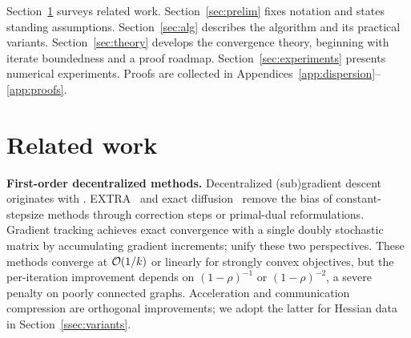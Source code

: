 \documentclass[review,onefignum,onetabnum]{siamart171218}
\begin{document}
Section~\ref{sec:related} surveys related work.
Section~\ref{sec:prelim} fixes notation and states standing assumptions.
Section~\ref{sec:alg} describes the algorithm and its practical variants.
Section~\ref{sec:theory} develops the convergence theory, beginning
with iterate boundedness and a proof roadmap.
Section~\ref{sec:experiments} presents numerical experiments.
Proofs are collected in
Appendices~\ref{app:dispersion}--\ref{app:proofs}.

	\section{Related work}\label{sec:related}
	
	\noindent\textbf{First-order decentralized methods.}
	Decentralized (sub)gradient descent originates with
	\citet{nedic2009subgradient}.
	EXTRA~\citep{shi2015extra} and exact
	diffusion~\citep{yuan2019exactdiffusion} remove the bias of
	constant-stepsize methods through correction steps or primal-dual
	reformulations.
	Gradient tracking
	\citep{nedic2017diging,xin2019distributed,pu2021distributed}
	achieves exact convergence with a single doubly stochastic matrix
	by accumulating gradient increments;
	\citet{alghunaim2020decentralized} unify these two perspectives.
	These methods converge at $\mathcal{O}(1/k)$ or linearly for strongly convex
	objectives, but the per-iteration improvement depends on
	$(1-\rho)^{-1}$ or $(1-\rho)^{-2}$, a severe penalty on poorly
	connected graphs.
	Acceleration \citep{jakovetic2014fast,li2021decentralized} and
	communication compression
	\citep{koloskova2019decentralized,beznosikov2023biased} are
	orthogonal improvements; we adopt the latter for Hessian data
	in Section~\ref{ssec:variants}.
\end{document}
